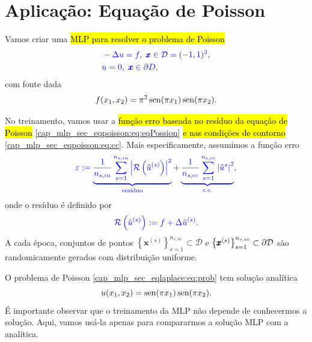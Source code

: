 \section{Aplicação: Equação de Poisson}\label{cap_mlp_sec_eqpoisson}

Vamos criar uma \hl{MLP para resolver o problema de Poisson}{\poisson}
\begin{subequations}\label{cap_mlp_sec_eqlaplace:eq:prob}
  \begin{align}
    &\color{blue}-\Delta u = f, ~\pmb{x}\in \mathcal{D} = (-1, 1)^2,\label{cap_mlp_sec_eqpoisson:eq:eqPossion}\\
    &\color{blue}u = 0, ~\pmb{x}\in\partial D,\label{cap_mlp_sec_eqpoisson:eq:cc}
  \end{align}
\end{subequations}
com fonte dada
\begin{equation}
  f(x_1, x_2) = \pi^2\operatorname{sen}(\pi x_1)\operatorname{sen}(\pi x_2).
\end{equation}

No treinamento, vamos usar a \hl{função erro baseada no resíduo da equação de Poisson} \eqref{cap_mlp_sec_eqpoisson:eq:eqPossion} \hl{e nas condições de contorno} \eqref{cap_mlp_sec_eqpoisson:eq:cc}. Mais especificamente, assumimos a função erro
\begin{equation}\color{blue}\varepsilon := \underbrace{\frac{1}{n_{s,in}}\sum_{s=1}^{n_{s,in}} \left|\mathcal{R}\left(\tilde{u}^{(s)}\right)\right|^2}_{\text{resíduo}} + \underbrace{\frac{1}{n_{s,cc}}\sum_{s=1}^{n_{s,cc}} \left|\tilde{u}^{s}\right|^2}_{\text{c.c.}},
\end{equation}
onde o resíduo é definido por
\begin{equation}\color{blue}\mathcal{R}\left(\tilde{u}^{(s)}\right) := f + \Delta\tilde{u}^{(s)}.
\end{equation}
A cada época, conjuntos de pontos $\left\{\pmb{x}^{(s)}\right\}_{s=1}^{n_{s,in}}\subset\mathcal{D}$ e $\left\{\pmb{x}^{(s)}\right\}_{s=1}^{n_{s,cc}}\subset\partial\mathcal{D}$ são randomicamente gerados com distribuição uniforme.

\begin{obs}
  O problema de Poisson \eqref{cap_mlp_sec_eqlaplace:eq:prob} tem solução analítica
  \begin{equation}
    u(x_1, x_2) = \operatorname{sen}(\pi x_1)\operatorname{sen}(\pi x_2).
  \end{equation}
  É importante observar que o treinamento da MLP não depende de conhecermos a solução. Aqui, vamos usá-la apenas para compararmos a solução MLP com a analítica.
\end{obs}

